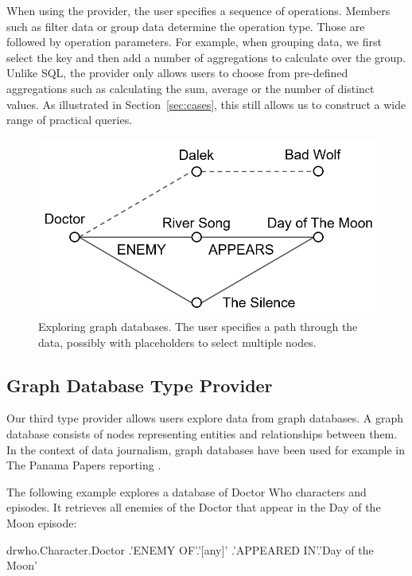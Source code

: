 \documentclass{sigchi}
\newcommand{\ikvd}[1]{{\fontfamily{zi4}\selectfont\small #1}}
\begin{document}
When using the provider, the user specifies a sequence of operations. Members such as
\ikvd{\textquotesingle filter data\textquotesingle} or \ikvd{\textquotesingle group data\textquotesingle}
determine the operation type. Those are followed by operation parameters. For example, when grouping
data, we first select the key and then add a number of aggregations to calculate over the group.
Unlike SQL, the provider only allows users to choose from pre-defined aggregations such as
calculating the sum, average or the number of distinct values. As illustrated in
Section~\ref{sec:cases}, this still allows us to construct a wide range of practical queries.


\begin{figure}
\centering
\includegraphics[scale=0.28]{figures/graphtp}
\vspace{0.5em}
\caption{Exploring graph databases. The user specifies a path through the data, possibly with
  placeholders to select multiple nodes.}
\label{fig:graphtp}
\end{figure}

\subsection{Graph Database Type Provider}
Our third type provider allows users explore data from graph databases. A graph database
consists of nodes representing entities and relationships between them. In the context of
data journalism, graph databases have been used for example in The Panama Papers reporting \cite{panama}.

The following example explores a database of Doctor Who characters and episodes. It retrieves
all enemies of the Doctor that appear in the Day of the Moon episode:

\begin{thegamma}
drwho.Character.Doctor
  .'ENEMY OF'.'[any]'
  .'APPEARED IN'.'Day of the Moon'
\end{thegamma}
\end{document}
